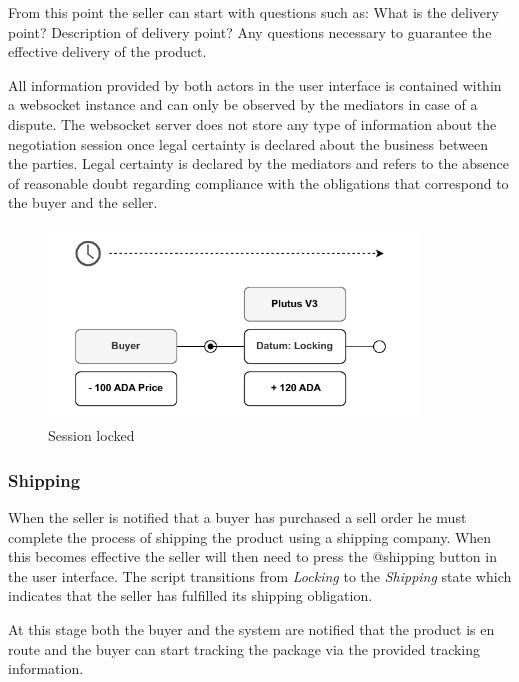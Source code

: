 \documentclass[12pt]{article}
\begin{document}
From this point the seller can start with questions such as: What is the delivery point? Description of delivery point? Any questions necessary to guarantee the effective delivery of the product.

All information provided by both actors in the user interface is contained within a websocket instance and can only be observed by the mediators in case of a dispute.
The websocket server does not store any type of information about the negotiation session once legal certainty is declared about the business between the parties.
Legal certainty is declared by the mediators and refers to the absence of reasonable doubt regarding compliance with the obligations that correspond to the buyer and the seller.

\begin{figure}[ht]
  \centering
  \includegraphics[width=0.88\textwidth, keepaspectratio]{2.pdf}
  \caption{Session locked}
  \label{fig:locking}
\end{figure}

\subsubsection { Shipping }

When the seller is notified that a buyer has purchased a sell order he must complete the process of shipping the product using a shipping company. When this becomes effective the seller will then need to press the @shipping button in the user interface.
The script transitions from \emph{Locking} to the \emph{Shipping} state which indicates that the seller has fulfilled its shipping obligation.

At this stage both the buyer and the system are notified that the product is en route and the buyer can start tracking the package via the provided tracking information.
\end{document}
